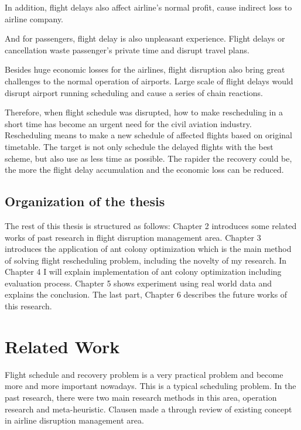 \documentclass[senior]{IPSstyle}
\begin{document}
In addition, flight delays also affect airline’s normal profit, cause indirect loss to airline company.

And for passengers, flight delay is also unpleasant experience. Flight delays or cancellation waste passenger’s private time and disrupt travel plans.

Besides huge economic losses for the airlines, flight disruption also bring great challenges to the normal operation of airports. Large scale of flight delays would disrupt airport running scheduling and cause a series of chain reactions. 

Therefore, when flight schedule was disrupted, how to make rescheduling in a short time has become an urgent need for the civil aviation industry. Rescheduling means to make a new schedule of affected flights based on original timetable.  The target is not only schedule the delayed flights with the best scheme, but also use as less time as possible. The rapider the recovery could be, the more the flight delay accumulation and the economic loss can be reduced.


\section{Organization of the thesis}
The rest of this thesis is structured as follows: Chapter 2 introduces some related works of past research in flight disruption management area. Chapter 3 introduces the application of ant colony optimization which is the main method of solving flight rescheduling problem, including the novelty of my research. In Chapter 4 I will explain implementation of ant colony optimization including evaluation process. Chapter 5 shows experiment using real world data and explains the conclusion. The last part, Chapter 6 describes the future works of this research.

\chapter{Related Work} \label{related_work}

Flight schedule and recovery problem is a very practical problem and become more and more important nowadays. This is a typical scheduling problem. In the past research, there were two main research methods in this area, operation research and meta-heuristic. Clausen\cite{clausen2010disruption} made a through review of existing concept in airline disruption management area.
\end{document}
